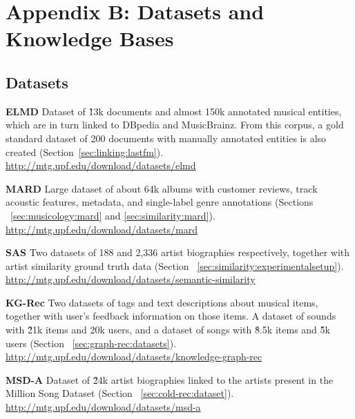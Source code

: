 
\chapter{Appendix B: Datasets and Knowledge Bases}
\label{appendix:datasets}

\section{Datasets}
\label{appendix:datasets:datasets}

\noindent \textbf{ELMD} Dataset of \~13k documents and almost 150k annotated musical entities, which are in turn linked to DBpedia and MusicBrainz. From this corpus, a gold standard dataset of 200 documents with manually annotated entities is also created (Section~\ref{sec:linking:lastfm}). \url{http://mtg.upf.edu/download/datasets/elmd}

\vspace{0.2cm}

\noindent \textbf{MARD} Large dataset of about 64k albums with customer reviews, track acoustic features, metadata, and single-label genre annotations (Sections ~\ref{sec:musicology:mard} and \ref{sec:similarity:mard}). \url{http://mtg.upf.edu/download/datasets/mard}

\vspace{0.2cm}

\noindent \textbf{SAS} Two datasets of 188 and 2,336 artist biographies respectively, together with artist similarity ground truth data (Section ~\ref{sec:similarity:experimentalsetup}). \url{http://mtg.upf.edu/download/datasets/semantic-similarity}

\vspace{0.2cm}

\noindent \textbf{KG-Rec} Two datasets of tags and text descriptions about musical items, together with user's feedback information on those items. A dataset of sounds with \~21k items and 20k users, and a dataset of songs with \~8.5k items and \~5k users (Section ~\ref{sec:graph-rec:datasets}). \url{http://mtg.upf.edu/download/datasets/knowledge-graph-rec}

\vspace{0.2cm}

\noindent \textbf{MSD-A} Dataset of \~24k artist biographies linked to the artists present in the Million Song Dataset (Section ~\ref{sec:cold-rec:dataset}). \url{http://mtg.upf.edu/download/datasets/msd-a}

